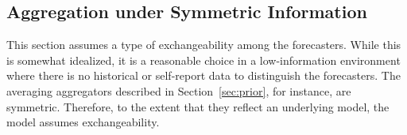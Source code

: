 \documentclass[11pt]{article}
\theoremstyle{definition}
\theoremstyle{definition}
\begin{document}
\subsection{Aggregation under Symmetric Information}
\label{compound2}
This section assumes a type of exchangeability
 among the forecasters.  While this is somewhat idealized,
it is a reasonable choice in a low-information environment where there is no historical or self-report data to
distinguish the forecasters.  The averaging aggregators described in 
Section~\ref{sec:prior}, for instance, are symmetric. Therefore,
to the extent that they reflect an underlying model, the model 
assumes exchangeability.
\end{document}
